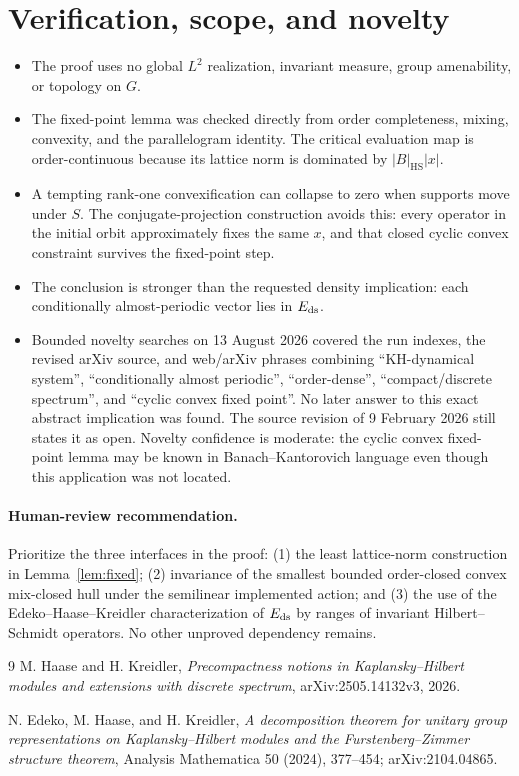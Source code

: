\documentclass[11pt]{article}
\newcommand{\HS}{\operatorname{HS}}
\begin{document}
\section{Verification, scope, and novelty}

\begin{itemize}
\item The proof uses no global $L^2$ realization, invariant measure, group
amenability, or topology on $G$.
\item The fixed-point lemma was checked directly from order completeness,
mixing, convexity, and the parallelogram identity.  The critical evaluation
map is order-continuous because its lattice norm is dominated by
$|B|_{\HS}|x|$.
\item A tempting rank-one convexification can collapse to zero when supports
move under $S$.  The conjugate-projection construction avoids this: every
operator in the initial orbit approximately fixes the same $x$, and that
closed cyclic convex constraint survives the fixed-point step.
\item The conclusion is stronger than the requested density implication:
each conditionally almost-periodic vector lies in $E_{\rm ds}$.
\item Bounded novelty searches on 13 August 2026 covered the run indexes,
the revised arXiv source, and web/arXiv phrases combining
``KH-dynamical system'', ``conditionally almost periodic'', ``order-dense'',
``compact/discrete spectrum'', and ``cyclic convex fixed point''.  No later
answer to this exact abstract implication was found.  The source revision of
9 February 2026 still states it as open.  Novelty confidence is moderate:
the cyclic convex fixed-point lemma may be known in Banach--Kantorovich
language even though this application was not located.
\end{itemize}

\paragraph{Human-review recommendation.}
Prioritize the three interfaces in the proof: (1) the least lattice-norm
construction in Lemma~\ref{lem:fixed}; (2) invariance of the smallest bounded
order-closed convex mix-closed hull under the semilinear implemented action;
and (3) the use of the Edeko--Haase--Kreidler characterization of
$E_{\rm ds}$ by ranges of invariant Hilbert--Schmidt operators.  No other
unproved dependency remains.

\begin{thebibliography}{9}
M. Haase and H. Kreidler,
\emph{Precompactness notions in Kaplansky--Hilbert modules and extensions
with discrete spectrum}, arXiv:2505.14132v3, 2026.

N. Edeko, M. Haase, and H. Kreidler,
\emph{A decomposition theorem for unitary group representations on
Kaplansky--Hilbert modules and the Furstenberg--Zimmer structure theorem},
Analysis Mathematica 50 (2024), 377--454; arXiv:2104.04865.
\end{thebibliography}
\end{document}
